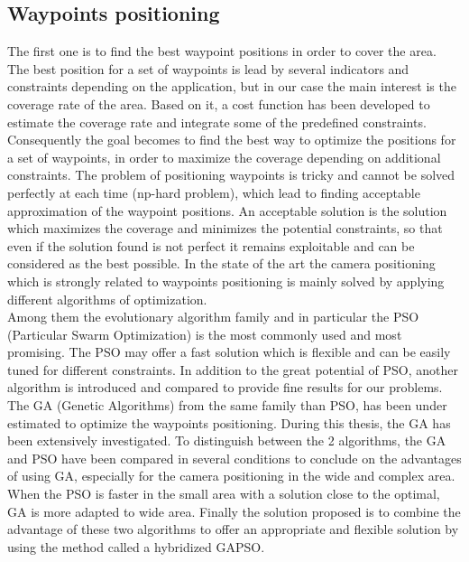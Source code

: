 \subsection{Waypoints positioning}
The first one is to find the best waypoint positions in order to cover the area. 
The best position for a set of waypoints is lead by several indicators and constraints depending on the application, but in our case the main interest is the coverage rate of the area. Based on it, a cost function has been developed to estimate the coverage rate and integrate some of the predefined constraints.\\
Consequently the goal becomes to find the best way to optimize the positions for a set of waypoints, in order to maximize the coverage depending on additional constraints. The problem of positioning waypoints is tricky and cannot be solved perfectly at each time (np-hard problem),  which lead to finding acceptable approximation of the waypoint positions.
An acceptable solution is the solution which maximizes the coverage and minimizes the potential constraints, so that even if the solution found is not perfect it remains exploitable and can be considered as the best possible.
In the state of the art the camera positioning which is  strongly related to waypoints positioning is mainly solved by applying different algorithms of optimization. \\ 
Among them the evolutionary algorithm family and in particular the PSO (Particular Swarm Optimization) is the most commonly used and most promising.
 The PSO may offer a fast solution which is flexible and  can be easily tuned for different constraints.
  In addition  to the great potential of PSO, another algorithm is introduced and compared to provide fine results for our problems.
The GA (Genetic Algorithms) from the same family than PSO, has been under estimated to optimize the waypoints positioning. During this thesis, the GA has been extensively investigated. 
To distinguish between the 2 algorithms, the GA and PSO have been compared in several conditions to conclude on the advantages of using GA, especially for the camera positioning in the wide and complex area. When the PSO is faster in the small area with a solution close to the optimal, GA is more adapted to wide area.
Finally the solution proposed is to combine the advantage of these two algorithms to offer an appropriate and flexible solution by using the method called a hybridized GAPSO. 

